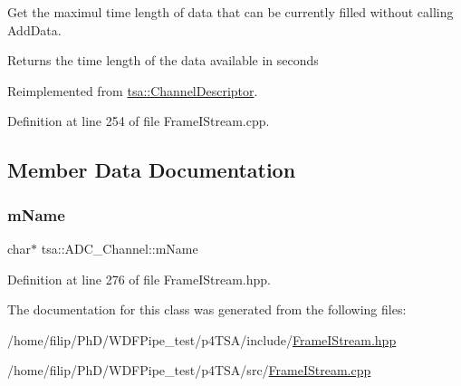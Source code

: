 Get the maximul time length of data that can be currently filled without calling Add\+Data.

\begin{DoxyReturn}{Returns}
the time length of the data available in seconds 
\end{DoxyReturn}


Reimplemented from \hyperlink{classtsa_1_1_channel_descriptor_a456d14e6136c389fbd307fabab7d7b73}{tsa\+::\+Channel\+Descriptor}.



Definition at line 254 of file Frame\+I\+Stream.\+cpp.



\subsection{Member Data Documentation}
\mbox{\label{classtsa_1_1_a_d_c___channel_a10f5984a8170a8cc68f5e78234166cd2}} 
\subsubsection{\texorpdfstring{m\+Name}{mName}}
{\footnotesize\ttfamily char$\ast$ tsa\+::\+A\+D\+C\+\_\+\+Channel\+::m\+Name\hspace{0.3cm}{\ttfamily [private]}}



Definition at line 276 of file Frame\+I\+Stream.\+hpp.



The documentation for this class was generated from the following files\+:\begin{DoxyCompactItemize}
\item 
/home/filip/\+Ph\+D/\+W\+D\+F\+Pipe\+\_\+test/p4\+T\+S\+A/include/\hyperlink{_frame_i_stream_8hpp}{Frame\+I\+Stream.\+hpp}\item 
/home/filip/\+Ph\+D/\+W\+D\+F\+Pipe\+\_\+test/p4\+T\+S\+A/src/\hyperlink{_frame_i_stream_8cpp}{Frame\+I\+Stream.\+cpp}\end{DoxyCompactItemize}
